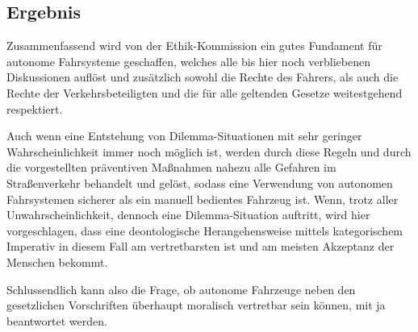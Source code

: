 \documentclass[a4paper, 12pt, openany]{book}
\begin{document}
            \subsection{Ergebnis}
                Zusammenfassend wird von der Ethik-Kommission ein gutes Fundament für autonome Fahrsysteme geschaffen, welches alle bis hier noch verbliebenen Diskussionen auflöst und zusätzlich sowohl die Rechte des Fahrers, als auch die Rechte der Verkehrsbeteiligten und die für alle geltenden Gesetze weitestgehend respektiert.\par
                Auch wenn eine Entstehung von Dilemma-Situationen mit sehr geringer Wahrscheinlichkeit immer noch möglich ist, werden durch diese Regeln und durch die vorgestellten präventiven Maßnahmen nahezu alle Gefahren im Straßenverkehr behandelt und gelöst, sodass eine Verwendung von autonomen Fahrsystemen sicherer als ein manuell bedientes Fahrzeug ist. Wenn, trotz aller Unwahrscheinlichkeit, dennoch eine Dilemma-Situation auftritt, wird hier vorgeschlagen, dass eine deontologische Herangehensweise mittels kategorischem Imperativ in diesem Fall am vertretbarsten ist und am meisten Akzeptanz der Menschen bekommt.\par
                Schlussendlich kann also die Frage, ob autonome Fahrzeuge neben den gesetzlichen Vorschriften überhaupt moralisch vertretbar sein können, mit ja beantwortet werden.

        
        
        
        
\end{document}
